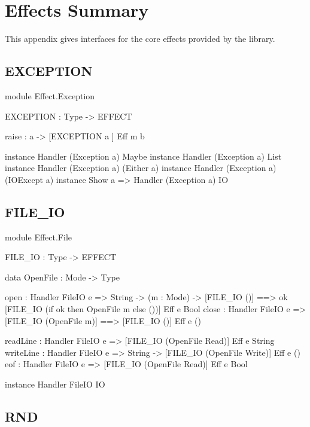 \section{Effects Summary}

\label{sect:appendix}
This appendix gives interfaces for the core effects provided by the \effects{}
library.

\subsection{EXCEPTION}

\begin{code}
module Effect.Exception

EXCEPTION : Type -> EFFECT

raise : a -> { [EXCEPTION a ] } Eff m b 

instance           Handler (Exception a) Maybe
instance           Handler (Exception a) List
instance           Handler (Exception a) (Either a)
instance           Handler (Exception a) (IOExcept a)
instance Show a => Handler (Exception a) IO
\end{code}

\subsection{FILE\_IO}

\begin{code}
module Effect.File

FILE_IO : Type -> EFFECT

data OpenFile : Mode -> Type

open  : Handler FileIO e => String -> (m : Mode) -> 
        { [FILE_IO ()] ==> 
          {ok} [FILE_IO (if ok then OpenFile m else ())] } Eff e Bool
close : Handler FileIO e =>
        { [FILE_IO (OpenFile m)] ==> [FILE_IO ()] } Eff e ()

readLine  : Handler FileIO e => 
           { [FILE_IO (OpenFile Read)] } Eff e String 
writeLine : Handler FileIO e => String -> 
           { [FILE_IO (OpenFile Write)] } Eff e ()
eof       : Handler FileIO e => 
           { [FILE_IO (OpenFile Read)] } Eff e Bool 

instance Handler FileIO IO
\end{code}

\subsection{RND}

